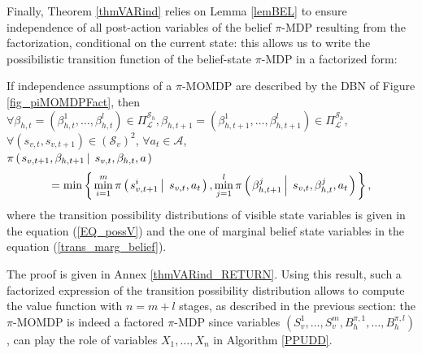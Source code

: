 Finally, Theorem \ref{thmVARind} relies on Lemma \ref{lemBEL} to ensure
independence of all post-action variables of the belief $\pi$-MDP resulting from the factorization,
conditional on the current state:
this allows us to write the possibilistic transition function of the 
belief-state $\pi$-MDP in a factorized form:
\begin{theorem}
\label{thmVARind}
If independence assumptions of a $\pi$-MOMDP are described by the DBN of Figure \ref{fig_piMOMDPFact},
then
$\forall \beta_{h,t}=(\beta^1_{h,t},\ldots,\beta^l_{h,t}) \in \Pi^{\mathcal{S}_h}_{\mathcal{L}}, 
\beta_{h,t+1} = (\beta^1_{h,t+1},\ldots,\beta^l_{h,t+1}) \in  \Pi^{\mathcal{S}_h}_{\mathcal{L}}$, 
$\forall (s_{v,t},s_{v,t+1}) \in (\mathcal{S}_v)^2$, 
$\forall a_t \in \mathcal{A}$, \\
$\pi \left( \left.  s_{v,t+1}, \beta_{h,t+1} \, \right| \left. \, s_{v,t}, \beta_{h,t}, a  \right. \right)$ 
\[  = \displaystyle  \min \left\{ \left.  \min_{i=1}^{m} \pi \left( \left.  s^i_{v,t+1} \, \right| \left. \, s_{v,t}, a_t  \right. \right) ,  \min_{j=1}^{l} \pi \left( \left.  \beta^j_{h,t+1} \, \right| \left. \, s_{v,t}, \beta^j_{h,t}, a_t   \right. \right)  \right. \right\}, \]
where the transition possibility distributions of visible state variables is given in the equation (\ref{EQ_possV})
and the one of marginal belief state variables in the equation (\ref{trans_marg_belief}).
\end{theorem}
The proof is given in Annex \ref{thmVARind_RETURN}.
Using this result, such a factorized expression of the transition possibility distribution
allows to compute the value function with $n=m+l$ stages, 
as described in the previous section:
the $\pi$-MOMDP is indeed a factored $\pi$-MDP
since variables $(S^1_v,\ldots,S^m_v,B^{\pi,1}_h,\ldots,B^{\pi,l}_h)$,
can play the role of variables $X_1,\ldots,X_n$
in Algorithm \ref{PPUDD}.	


